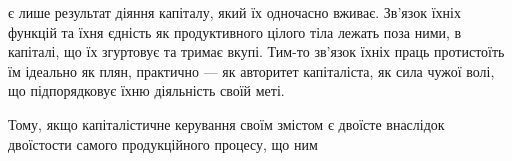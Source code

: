 є лише результат діяння капіталу, який їх одночасно вживає.
Зв’язок їхніх функцій та їхня єдність як продуктивного цілого
тіла лежать поза ними, в капіталі, що їх згуртовує та тримає
вкупі. Тим-то зв’язок їхніх праць протистоїть їм ідеально як плян,
практично — як авторитет капіталіста, як сила чужої волі, що
підпорядковує їхню діяльність своїй меті.

Тому, якщо капіталістичне керування своїм змістом є двоїсте
внаслідок двоїстости самого продукційного процесу, що ним
\parbreak{}  %
